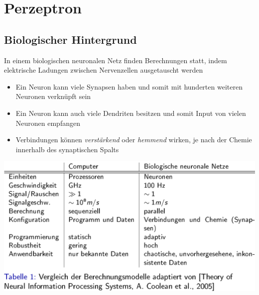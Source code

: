 \documentclass{report}
\begin{document}
  \section{Perzeptron}	
  \subsection{Biologischer Hintergrund}	
  In einem biologischen neuronalen Netz finden Berechnungen statt, indem elektrische Ladungen zwischen Nervenzellen ausgetauscht werden\\	
  \vspace*{-1.25em}	
  \begin{itemize}	
    \item Ein Neuron kann viele Synapsen haben und somit mit hunderten weiteren Neuronen verknüpft sein	
    \item Ein Neuron kann auch viele Dendriten besitzen und somit Input von vielen Neuronen empfangen	
    \item Verbindungen können \textit{verstärkend} oder \textit{hemmend} wirken, je nach der Chemie innerhalb des synaptischen Spalts	
  \end{itemize}	
  \begin{center}	
    \includegraphics[scale=.2275]{ml04_3}	
  \end{center}	
  
\end{document}
